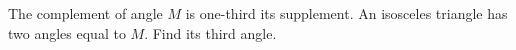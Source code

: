 The complement of angle $M$ is one-third its supplement. An isosceles triangle has two angles equal to $M$. Find its third angle.
